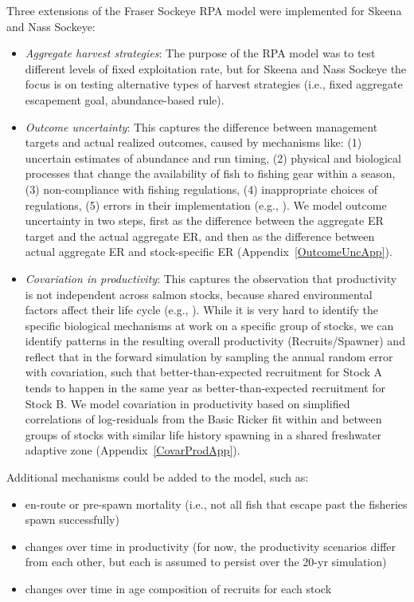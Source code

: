 \documentclass[french,11pt]{book}
\begin{document}
Three extensions of the Fraser Sockeye RPA model were implemented for Skeena and Nass Sockeye:
\begin{itemize}

\item
  \emph{Aggregate harvest strategies}: The purpose of the RPA model was to test different levels of fixed exploitation rate, but for Skeena and Nass Sockeye the focus is on testing alternative types of harvest strategies (i.e., fixed aggregate escapement goal, abundance-based rule).
\item
  \emph{Outcome uncertainty}: This captures the difference between management targets and actual realized outcomes, caused by mechanisms like: (1) uncertain estimates of abundance and run timing, (2) physical and biological processes that change the availability of fish to fishing gear within a season, (3) non-compliance with fishing regulations, (4) inappropriate choices of regulations, (5) errors in their implementation (e.g., ). We model outcome uncertainty in two steps, first as the difference between the aggregate ER target and the actual aggregate ER, and then as the difference between actual aggregate ER and stock-specific ER (Appendix~\ref{OutcomeUncApp}).
\item
  \emph{Covariation in productivity}: This captures the observation that productivity is not independent across salmon stocks, because shared environmental factors affect their life cycle (e.g., ). While it is very hard to identify the specific biological mechanisms at work on a specific group of stocks, we can identify patterns in the resulting overall productivity (Recruits/Spawner) and reflect that in the forward simulation by sampling the annual random error with covariation, such that better-than-expected recruitment for Stock A tends to happen in the same year as better-than-expected recruitment for Stock B. We model covariation in productivity based on simplified correlations of log-residuals from the Basic Ricker fit within and between groups of stocks with similar life history spawning in a shared freshwater adaptive zone (Appendix~\ref{CovarProdApp}).
\end{itemize}
Additional mechanisms could be added to the model, such as:
\begin{itemize}

\item
  en-route or pre-spawn mortality (i.e., not all fish that escape past the fisheries spawn successfully)
\item
  changes over time in productivity (for now, the productivity scenarios differ from each other, but each is assumed to persist over the 20-yr simulation)
\item
  changes over time in age composition of recruits for each stock
\end{itemize}
\end{document}

